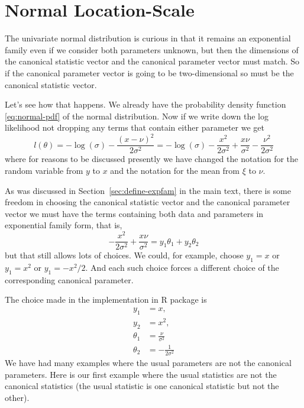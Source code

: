 \section{Normal Location-Scale} \label{sec:normal-location-scale}

The univariate normal distribution is curious in that it remains an exponential
family even if we consider both parameters unknown, but then
the dimensions of the canonical statistic vector and the canonical parameter
vector must match.  So if the canonical parameter vector is going to be
two-dimensional so must be the canonical statistic vector.

Let's see how that happens.  We already have the probability density
function \eqref{eq:normal-pdf} of the normal distribution.
Now if we write down the log likelihood not dropping any terms that contain
either parameter we get
\begin{equation} \label{eq:logl-normal-location-scale}
   l(\theta)
   =
   - \log(\sigma) - \frac{(x - \nu)^2}{2 \sigma^2}
   =
   - \log(\sigma) - \frac{x^2}{2 \sigma^2}
   + \frac{x \nu}{\sigma^2}
   - \frac{\nu^2}{2 \sigma^2}
\end{equation}
where for reasons to be discussed presently we have changed the notation
for the random variable from $y$ to $x$ and the notation
for the mean from $\xi$ to $\nu$.

As was discussed in Section~\ref{sec:define-expfam} in the main text,
there is some freedom in choosing the canonical statistic vector and
the canonical parameter vector we must have the terms containing both
data and parameters in exponential family form, that is,
$$
   - \frac{x^2}{2 \sigma^2} + \frac{x \nu}{\sigma^2}
   =
   y_1 \theta_1 + y_2 \theta_2
$$
but that still allows lots of choices.
We could, for example, choose $y_1 = x$ or $y_1 = x^2$ or $y_1 = - x^2 / 2$.
And each such choice forces a different choice of the corresponding
canonical parameter.

The choice made in the implementation in R package  is
\begin{align*}
   y_1 & = x,
   \\
   y_2 & = x^2,
   \\
   \theta_1 & = \frac{\nu}{\sigma^2}
   \\
   \theta_2 & = - \frac{1}{2 \sigma^2}
\end{align*}
We have had many examples where the usual parameters are not the canonical
parameters.  Here is our first example where the usual statistics are not
the canonical statistics (the usual statistic is one canonical statistic
but not the other).

